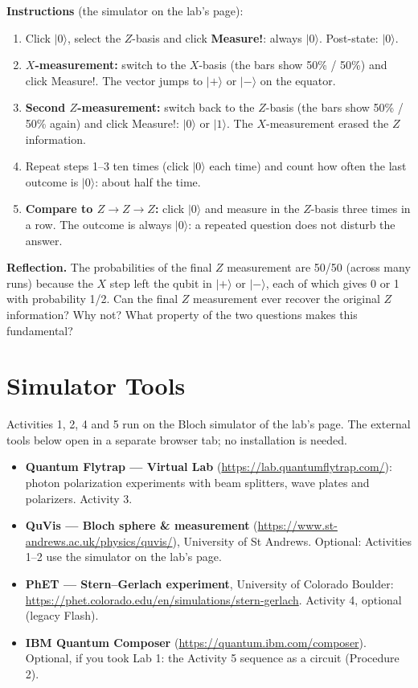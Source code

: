 \documentclass[a4paper,11pt]{article}
\newcommand{\keepspace}[1]{\par\vspace{0pt plus #1}\penalty-300\vspace{0pt plus -#1}}
\providecommand{\ket}[1]{|{#1}\rangle}
\begin{document}
\begin{studentbox}
\medskip
\textbf{Instructions} (the simulator on the lab's page):
\begin{enumerate}
    \item Click $\ket{0}$, select the $Z$-basis and click \textbf{Measure!}: always $\ket{0}$.
          Post-state: $\ket{0}$.
    \item \textbf{$X$-measurement:} switch to the $X$-basis (the bars show 50\% / 50\%) and
          click Measure!. The vector jumps to $\ket{+}$ or $\ket{-}$ on the equator.
    \item \textbf{Second $Z$-measurement:} switch back to the $Z$-basis (the bars show
          50\% / 50\% again) and click Measure!: $\ket{0}$ or $\ket{1}$. The
          $X$-measurement erased the $Z$ information.
    \item Repeat steps 1--3 ten times (click $\ket{0}$ each time) and count how often the
          last outcome is $\ket{0}$: about half the time.
    \item \textbf{Compare to $Z \to Z \to Z$:} click $\ket{0}$ and measure in the $Z$-basis
          three times in a row. The outcome is always $\ket{0}$: a repeated question does
          not disturb the answer.
\end{enumerate}

\textbf{Reflection.} The probabilities of the final $Z$ measurement are 50/50 (across many
runs) because the $X$ step left the qubit in $\ket{+}$ or $\ket{-}$, each of which gives
0 or 1 with probability 1/2. Can the final $Z$ measurement ever recover the original $Z$
information? Why not? What property of the two questions makes this fundamental?
\end{studentbox}

\keepspace{10\baselineskip}
\section{Simulator Tools}

Activities 1, 2, 4 and 5 run on the Bloch simulator of the lab's page. The external tools
below open in a separate browser tab; no installation is needed.
\begin{itemize}
    \item \textbf{Quantum Flytrap --- Virtual Lab}
          (\url{https://lab.quantumflytrap.com/}): photon polarization experiments with
          beam splitters, wave plates and polarizers. Activity 3.
    \item \textbf{QuVis --- Bloch sphere \& measurement}
          (\url{https://www.st-andrews.ac.uk/physics/quvis/}), University of St Andrews.
          Optional: Activities 1--2 use the simulator on the lab's page.
    \item \textbf{PhET --- Stern--Gerlach experiment}, University of Colorado Boulder:\\
          \url{https://phet.colorado.edu/en/simulations/stern-gerlach}.
          Activity 4, optional (legacy Flash).
    \item \textbf{IBM Quantum Composer} (\url{https://quantum.ibm.com/composer}).
          Optional, if you took Lab 1: the Activity 5 sequence as a circuit (Procedure 2).
\end{itemize}
\end{document}
